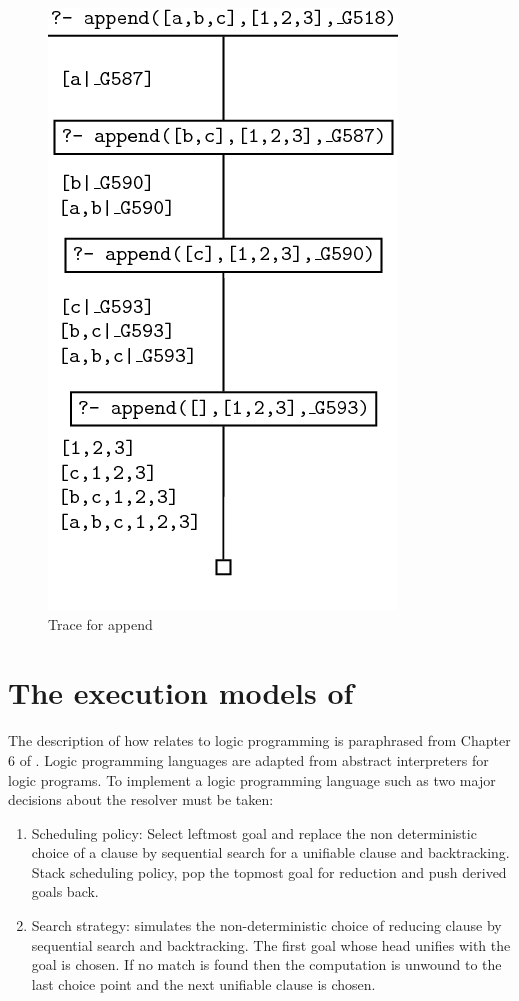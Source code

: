 \documentclass[thesis-solanki.tex]{subfiles}
\begin{document}
\begin{figure}[H]
\centering
\includegraphics[scale = 0.5]{PrologAppendWorking.png}
\caption{Trace for append \cite{webiste:learnprolognowappend}}
\label{fig:Trace for append}
\end{figure}


\section[{The execution models of \progLang{Prolog}}]{The execution models of }\label{sec:exec-models-prolog}

The description of how  relates to logic programming is paraphrased from Chapter 6 of
\cite{Sterling:1994:APA:175753}.
Logic programming languages are adapted from abstract interpreters for logic programs.
To implement a logic programming language such as  two major decisions about the resolver must be
taken:
\begin{enumerate}
\item Scheduling policy:
  Select leftmost goal and replace the non deterministic choice of a clause by sequential search for a unifiable
  clause and backtracking.
  Stack scheduling policy, pop the topmost goal for reduction and push derived goals back.

\item Search strategy:
   simulates the non-deterministic choice of reducing clause by sequential search and
  backtracking.
  The first goal whose head unifies with the goal is chosen.
  If no match is found then the computation is unwound to the last choice point and the next unifiable clause is
  chosen.
\end{enumerate}
\end{document}
